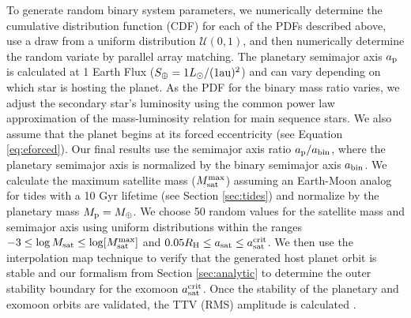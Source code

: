 \documentclass[preprint]{aastex63}
\begin{document}
To generate random binary system parameters, we numerically determine the cumulative distribution function (CDF) for each of the PDFs described above, use a draw from a uniform distribution $\mathcal{U}(0,1)$, and then numerically determine the random variate by parallel array matching.  The planetary semimajor axis $a_{\rm p}$ is calculated at 1 Earth Flux ($S_\oplus = 1 L_\odot/(1 {\rm au})^2$) and can vary depending on which star is hosting the planet.  As the PDF for the binary mass ratio varies, we adjust the secondary star's luminosity using the common power law approximation of the mass-luminosity relation for main sequence stars.  We also assume that the planet begins at its forced eccentricity (see Equation \ref{eq:eforced}).  Our final results use the semimajor axis ratio $a_{\rm p}/a_{\rm bin}$, where the planetary semimajor axis is normalized by the binary semimajor axis $a_{\rm bin}$.  We calculate the maximum satellite mass ($M_{\rm sat}^{\rm max}$) assuming an Earth-Moon analog for tides with a 10 Gyr lifetime (see Section \ref{sec:tides}) and normalize by the planetary mass $M_{\rm p} = M_\oplus$.  We choose 50 random values for the satellite mass and semimajor axis using uniform distributions within the ranges $-3 \leq \log M_{\rm sat} \leq \log [M_{\rm sat}^{\rm max}]$ and $0.05 R_{\rm H}\leq a_{\rm sat} \leq a_{\rm sat}^{\rm crit}$.  We then use the interpolation map technique \citep{Quarles2020} to verify that the generated host planet orbit is stable and our formalism from Section \ref{sec:analytic} to determine the outer stability boundary for the exomoon  $a_{\rm sat}^{\rm crit}$.  Once the stability of the planetary and exomoon orbits are validated, the TTV {(RMS)} amplitude is calculated \citep[][see their Eqn. A27]{Kipping2009a}.
\end{document}
